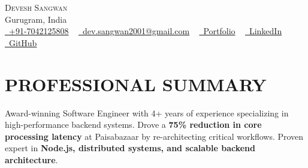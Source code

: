 \documentclass[letterpaper,11pt]{article}
\begin{document}
\begin{center}
    {\Huge \scshape Devesh Sangwan} \\ \vspace{1pt}
    Gurugram, India \\
    \small \href{tel:+91-7042125808}{\raisebox{-0.1\height}\faPhone~+91-7042125808} ~
    \href{mailto:dev.sangwan2001@gmail.com}{\raisebox{-0.2\height}\faEnvelope~dev.sangwan2001@gmail.com} ~
    \href{https://deveshsangwan.com}{\raisebox{-0.1\height}{\faGlobe}~Portfolio} ~
    \href{https://www.linkedin.com/in/deveshsangwan/}{\raisebox{-0.2\height}\faLinkedin~LinkedIn} ~
    \href{https://github.com/deveshsangwan}{\raisebox{-0.2\height}\faGithub~GitHub}
\end{center}


\section{PROFESSIONAL SUMMARY}
\vspace{-2pt}
\small{Award-winning Software Engineer with 4+ years of experience specializing in high-performance backend systems. Drove a \textbf{75\% reduction in core processing latency} at Paisabazaar by re-architecting critical workflows. Proven expert in \textbf{Node.js, distributed systems, and scalable backend architecture}.}


\end{document}
